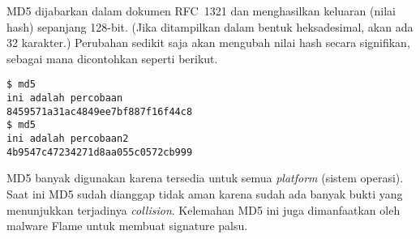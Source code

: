MD5 dijabarkan dalam dokumen RFC~1321\cite{MD5} dan menghasilkan keluaran (nilai hash) sepanjang 128-bit. (Jika ditampilkan dalam bentuk heksadesimal, akan ada 32 karakter.) Perubahan sedikit saja akan mengubah nilai hash secara signifikan, sebagai mana dicontohkan seperti berikut.

\begin{mdframed}
\begin{verbatim}
$ md5
ini adalah percobaan
8459571a31ac4849ee7bf887f16f44c8
$ md5
ini adalah percobaan2
4b9547c47234271d8aa055c0572cb999
\end{verbatim}
\end{mdframed}

\begin{mdframed}
\begin{ExerciseList}
   \Exercise[title=MD5]
\end{ExerciseList}
\end{mdframed}

MD5 banyak digunakan karena tersedia untuk semua {\em platform} (sistem operasi). Saat ini MD5 sudah dianggap tidak aman karena sudah ada banyak bukti yang menunjukkan terjadinya {\em collision}. Kelemahan MD5 ini juga dimanfaatkan oleh malware Flame untuk membuat signature palsu.